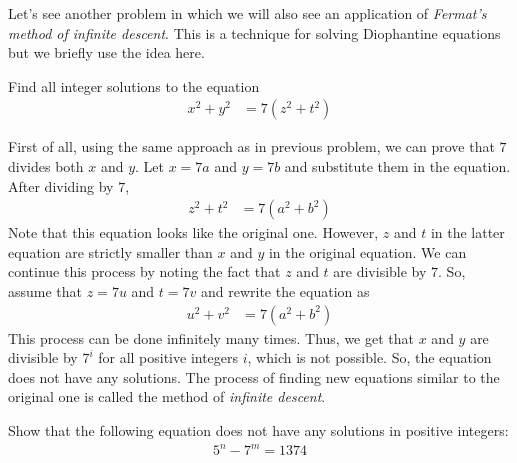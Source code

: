 	Let's see another problem in which we will also see an application of \textit{Fermat's method of infinite descent}. This is a technique for solving Diophantine equations but we briefly use the idea here.
		\begin{problem}
			Find all integer solutions to the equation
				\begin{align*}
					x^2+y^2 & = 7(z^2+t^2)
				\end{align*}
		\end{problem}

		\begin{solution}
			First of all, using the same approach as in previous problem, we can prove that $7$ divides both $x$ and $y$. Let $x=7a$ and $y=7b$ and substitute them in the equation. After dividing by $7$,
				\begin{align*}
					z^2+t^2 & = 7(a^2+b^2)
				\end{align*}
			Note that this equation looks like the original one. However, $z$ and $t$ in the latter equation are strictly smaller than $x$ and $y$ in the original equation. We can continue this process by noting the fact that $z$ and $t$ are divisible by $7$. So, assume that $z=7u$ and $t=7v$ and rewrite the equation as
				\begin{align*}
				u^2+v^2 & = 7(a^2+b^2)
				\end{align*}
			This process can be done infinitely many times. Thus, we get that $x$ and $y$ are divisible by $7^i$ for all positive integers $i$, which is not possible. So, the equation does not have any solutions. The process of finding new equations similar to the original one is called the method of \textit{infinite descent}.
		\end{solution}


		\begin{problem}
			Show that the following equation does not have any solutions in positive integers:
				\begin{align*}
					5^n-7^m = 1374
				\end{align*}
		\end{problem}

